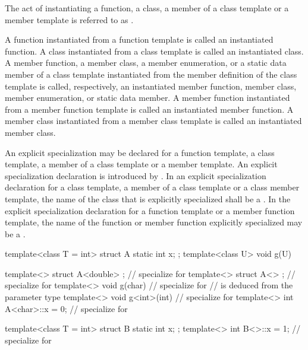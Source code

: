 \pnum
{}%
The act of instantiating a function, a class, a member of a class template or
a member template is referred to as
.

\pnum
A function instantiated from a function template is called an instantiated
function.
A class instantiated from a class template is called an instantiated class.
A member function, a member class, a member enumeration, or a static data member of a class template
instantiated from the member definition of the class template is called,
respectively, an instantiated member function, member class, member enumeration, or static data
member.
A member function instantiated from a member function template is called an
instantiated member function.
A member class instantiated from a member class template is called an
instantiated member class.

\pnum
An explicit specialization may be declared for a function template,
a class template, a member of a class template or a member template.
An explicit specialization declaration is introduced by
.
In an explicit specialization declaration for a class template,
a member of a class template or a class member template,
the name of the class that is explicitly specialized shall be a
.
In the explicit specialization declaration for a function template or
a member function template,
the name of the function or member function explicitly specialized may be a
.
\begin{example}

\begin{codeblock}
template<class T = int> struct A {
  static int x;
};
template<class U> void g(U) { }

template<> struct A<double> { };        // specialize for 
template<> struct A<> { };              // specialize for 
template<> void g(char) { }             // specialize for 
                                        //  is deduced from the parameter type
template<> void g<int>(int) { }         // specialize for 
template<> int A<char>::x = 0;          // specialize for 

template<class T = int> struct B {
  static int x;
};
template<> int B<>::x = 1;              // specialize for 
\end{codeblock}
\end{example}

